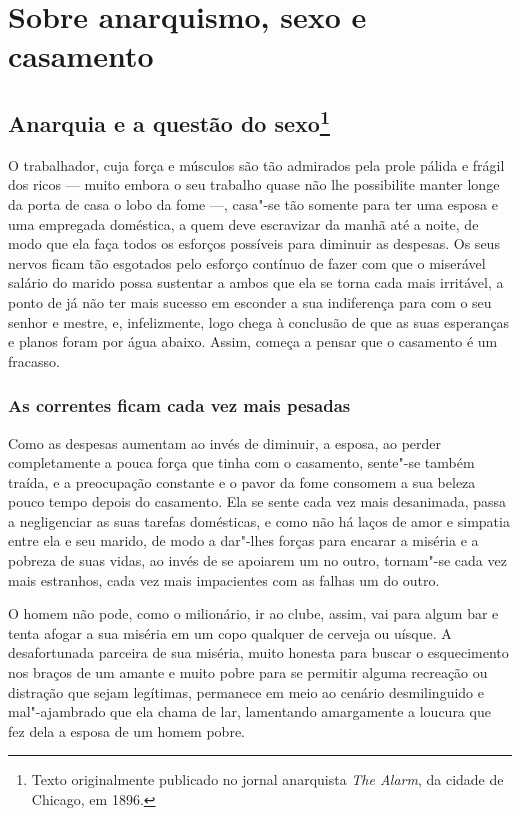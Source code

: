 \part{Sobre anarquismo, sexo e casamento}

\chapter{Anarquia e a questão do sexo\footnote{Texto originalmente publicado no
  jornal anarquista \emph{The Alarm}, da cidade de Chicago, em 1896.}}

O trabalhador, cuja força e músculos são tão admirados pela prole pálida
e frágil dos ricos --- muito embora o seu trabalho quase não lhe
possibilite manter longe da porta de casa o lobo da fome ---, casa"-se tão
somente para ter uma esposa e uma empregada doméstica, a quem deve
escravizar da manhã até a noite, de modo que ela faça todos os esforços
possíveis para diminuir as despesas. Os seus nervos ficam tão esgotados
pelo esforço contínuo de fazer com que o miserável salário do marido
possa sustentar a ambos que ela se torna cada mais irritável, a ponto de 
já não ter mais sucesso em esconder a sua indiferença para com o seu
senhor e mestre, e, infelizmente, logo chega à conclusão de que as suas 
esperanças e planos foram por água abaixo. Assim, começa a pensar que o
casamento é um fracasso.

\section{As correntes ficam cada vez mais pesadas}

Como as despesas aumentam ao invés de diminuir, a esposa, ao perder
completamente a pouca força que tinha com o casamento, sente"-se também
traída, e a preocupação constante e o pavor da fome consomem a sua
beleza pouco tempo depois do casamento. Ela se sente cada vez
mais desanimada, passa a negligenciar as suas tarefas domésticas, e como
não há laços de amor e simpatia entre ela e seu marido, de modo a
dar"-lhes forças para encarar a miséria e a pobreza de suas vidas, ao
invés de se apoiarem um no outro, tornam"-se cada vez mais estranhos,
cada vez mais impacientes com as falhas um do outro.

O homem não pode, como o milionário, ir ao clube, assim, vai para algum
bar e tenta afogar a sua miséria em um copo qualquer de cerveja ou
uísque. A desafortunada parceira de sua miséria, muito honesta
para buscar o esquecimento nos braços de um amante e muito pobre para se
permitir alguma recreação ou distração que sejam legítimas, permanece em
meio ao cenário desmilinguido e mal"-ajambrado que ela chama de lar,
lamentando amargamente a loucura que fez dela a esposa de um homem
pobre.

